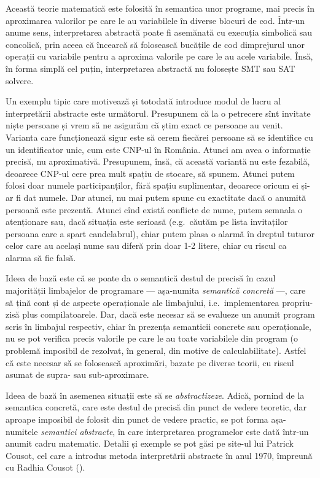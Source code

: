 \indent\indent Această teorie matematică este folosită în semantica unor
programe, mai precis în aproximarea valorilor pe care le au variabilele în diverse
blocuri de cod. Într-un anume sens, interpretarea abstractă poate fi asemănată
cu execuția simbolică sau concolică, prin aceea că încearcă să folosească
bucățile de cod dimprejurul unor operații cu variabile pentru a aproxima
valorile pe care le au acele variabile. Însă, în forma simplă cel puțin,
interpretarea abstractă nu folosește SMT sau SAT solvere.

Un exemplu tipic care motivează și totodată introduce modul de lucru al
interpretării abstracte este următorul. Presupunem că la o petrecere sînt
invitate niște persoane și vrem să ne asigurăm că știm exact ce persoane au venit.
Varianta care funcționează sigur este să cerem fiecărei persoane să se identifice
cu un identificator unic, cum este CNP-ul în România. Atunci am avea o informație
precisă, nu aproximativă. Presupunem, însă, că această variantă nu este fezabilă,
deoarece CNP-ul cere prea mult spațiu de stocare, să spunem. Atunci putem folosi
doar numele participanților, fără spațiu suplimentar, deoarece oricum ei și-ar fi
dat numele. Dar atunci, nu mai putem spune cu exactitate dacă o anumită persoană
este prezentă. Atunci cînd există conflicte de nume, putem semnala o atenționare
sau, dacă situația este serioasă (e.g.\ căutăm pe lista invitaților persoana care
a spart candelabrul), chiar putem plasa o alarmă în dreptul tuturor celor care
au același nume sau diferă prin doar 1-2 litere, chiar cu riscul ca alarma să fie
falsă.

Ideea de bază este că se poate da o semantică destul de precisă în cazul majorității
limbajelor de programare --- așa-numita \emph{semantică concretă} ---, care să țină
cont și de aspecte operaționale ale limbajului, i.e.\ implementarea propriu-zisă
plus compilatoarele. Dar, dacă este necesar să se evalueze un anumit program scris
în limbajul respectiv, chiar în prezența semanticii concrete sau operaționale,
nu se pot verifica precis valorile pe care le au toate variabilele din program
(o problemă imposibil de rezolvat, în general, din motive de calculabilitate).
Astfel că este necesar să se folosească aproximări, bazate pe diverse teorii,
cu riscul asumat de supra- sau sub-aproximare.

Ideea de bază în asemenea situații este să se \emph{abstractizeze}. Adică,
pornind de la semantica concretă, care este destul de precisă din punct de vedere
teoretic, dar aproape imposibil de folosit din punct de vedere practic,
se pot forma așa-numitele \emph{semantici abstracte}, în care interpretarea
programelor este dată într-un anumit cadru matematic. Detalii și exemple se pot
găsi pe site-ul lui Patrick Cousot, cel care a introdus metoda interpretării abstracte
în anul 1970, împreună cu Radhia Cousot (\cite{abs}).

